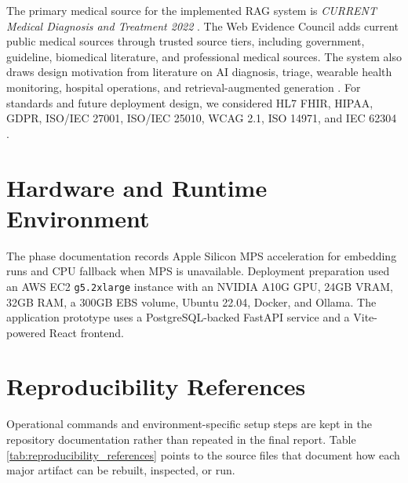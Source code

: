 The primary medical source for the implemented RAG system is \textit{CURRENT Medical Diagnosis and Treatment 2022} \cite{cmdt2022}. The Web Evidence Council adds current public medical sources through trusted source tiers, including government, guideline, biomedical literature, and professional medical sources. The system also draws design motivation from literature on AI diagnosis, triage, wearable health monitoring, hospital operations, and retrieval-augmented generation \cite{esteva2017dermatology,fernandes2020triage,judson2020selftriage,seshadri2020wearables,bayoumy2021wearables,lewis2020rag}. For standards and future deployment design, we considered HL7 FHIR, HIPAA, GDPR, ISO/IEC 27001, ISO/IEC 25010, WCAG 2.1, ISO 14971, and IEC 62304 \cite{hl7fhir,hipaa,gdpr,iso27001,iso25010,wcag21,iso14971,iec62304}.

\section{Hardware and Runtime Environment}

The phase documentation records Apple Silicon MPS acceleration for embedding runs and CPU fallback when MPS is unavailable. Deployment preparation used an AWS EC2 \texttt{g5.2xlarge} instance with an NVIDIA A10G GPU, 24GB VRAM, 32GB RAM, a 300GB EBS volume, Ubuntu 22.04, Docker, and Ollama. The application prototype uses a PostgreSQL-backed FastAPI service and a Vite-powered React frontend.

\section{Reproducibility References}

Operational commands and environment-specific setup steps are kept in the repository documentation rather than repeated in the final report. Table \ref{tab:reproducibility_references} points to the source files that document how each major artifact can be rebuilt, inspected, or run.

